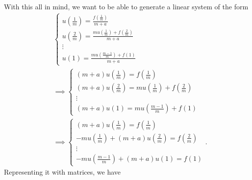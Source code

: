 \documentclass[letterpaper]{article}
\newcommand{\0}{\mathbf{0}}
\begin{document}
With this all in mind, we want to be able to generate a linear system of the form 
\begin{equation*}
    \begin{aligned}
        &\begin{cases}
            u\left(\frac{1}{m}\right) = \frac{f\left(\frac{1}{m}\right)}{m + a} \\ 
            u\left(\frac{2}{m}\right) = \frac{mu\left(\frac{1}{m}\right) + f\left(\frac{2}{m}\right)}{m + a} \\ 
            \vdots \\ 
            u(1) = \frac{mu(\frac{m - 1}{m}) + f(1)}{m + a}
        \end{cases} \\ 
        &\implies \begin{cases}
            (m + a) u\left(\frac{1}{m}\right) = f\left(\frac{1}{m}\right) \\ 
            (m + a) u\left(\frac{2}{m}\right) = mu\left(\frac{1}{m}\right) + f\left(\frac{2}{m}\right) \\ 
            \vdots \\ 
            (m + a) u(1) = mu(\frac{m - 1}{m}) + f(1)
        \end{cases} \\ 
        &\implies \begin{cases}
            (m + a) u\left(\frac{1}{m}\right) = f\left(\frac{1}{m}\right) \\ 
            -mu\left(\frac{1}{m}\right) + (m + a) u\left(\frac{2}{m}\right) = f\left(\frac{2}{m}\right) \\ 
            \vdots \\ 
            -mu(\frac{m - 1}{m}) + (m + a) u(1) = f(1)
        \end{cases}.
    \end{aligned}
\end{equation*}
Representing it with matrices, we have 
\end{document}
